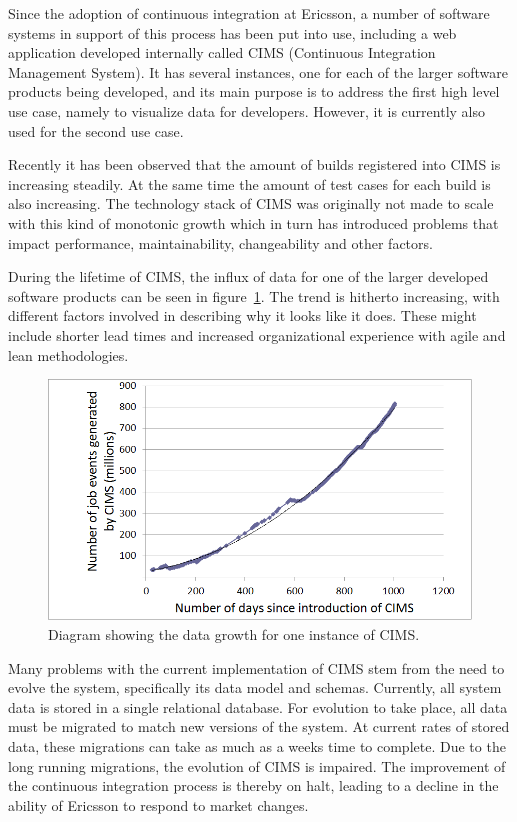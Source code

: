 Since the adoption of continuous integration at Ericsson, a number of software systems in support of this process has been put into use, including a web application developed internally called CIMS (Continuous Integration Management System). It has several instances, one for each of the larger software products being developed, and its main purpose is to address the first high level use case, namely to visualize data for developers. However, it is currently also used for the second use case.

Recently it has been observed that the amount of builds registered into CIMS is increasing steadily. At the same time the amount of test cases for each build is also increasing. The technology stack of CIMS was originally not made to scale with this kind of monotonic growth which in turn has introduced problems that impact performance, maintainability, changeability and other factors.

During the lifetime of CIMS, the influx of data for one of the larger developed software products can be seen in figure~\ref{fig:jeTrend}. The trend is hitherto increasing, with different factors involved in describing why it looks like it does. These might include shorter lead times and increased organizational experience with agile and lean methodologies.

\begin{figure}[h!]
\centering
\includegraphics[scale=0.65]{figure/jeTrend.png}
\caption{Diagram showing the data growth for one instance of CIMS.}
\label{fig:jeTrend}
\end{figure}

Many problems with the current implementation of CIMS stem from the need to evolve the system, specifically its data model and schemas. Currently, all system data is stored in a single relational database. For evolution to take place, all data must be migrated to match new versions of the system. At current rates of stored data, these migrations can take as much as a weeks time to complete. Due to the long running migrations, the evolution of CIMS is impaired. The improvement of the continuous integration process is thereby on halt, leading to a decline in the ability of Ericsson to respond to market changes.

